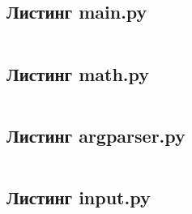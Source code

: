 \documentclass[a4paper,14pt]{extarticle}
\begin{document}
\subsection*{Листинг main.py}
\inputminted[mathescape,linenos,breaklines]{python}{../src/main.py}

\subsection*{Листинг math.py}
\inputminted[mathescape,linenos,breaklines]{python}{../src/models/math.py}

\subsection*{Листинг argparser.py}
\inputminted[mathescape,linenos,breaklines]{python}{../src/utils/argparser.py}

\subsection*{Листинг input.py}
\inputminted[mathescape,linenos,breaklines]{python}{../src/utils/input.py}
\end{document}
